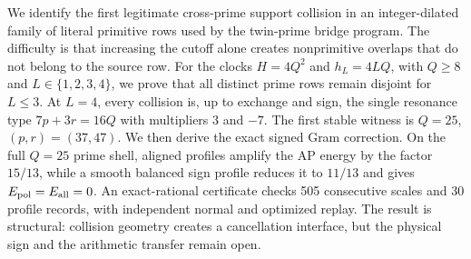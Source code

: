 We identify the first legitimate cross-prime support collision in an integer-dilated
family of literal primitive rows used by the twin-prime bridge program.  The difficulty
is that increasing the cutoff alone creates nonprimitive overlaps that do not belong to
the source row.  For the clocks $H=4Q^2$ and $h_L=4LQ$, with $Q\ge8$ and
$L\in\{1,2,3,4\}$, we prove that all distinct prime rows remain disjoint for
$L\le3$.  At $L=4$, every collision is, up to exchange and sign, the single
resonance type $7p+3r=16Q$ with multipliers $3$ and $-7$.  The first stable witness
is $Q=25$, $(p,r)=(37,47)$.  We then derive the exact signed Gram correction.
On the full $Q=25$ prime shell, aligned profiles amplify the AP energy by the factor
$15/13$, while a smooth balanced sign profile reduces it to $11/13$ and gives
$E_{\rm pol}=E_{\rm all}=0$.  An exact-rational certificate checks 505 consecutive
scales and 30 profile records, with independent normal and optimized replay.  The
result is structural: collision geometry creates a cancellation interface, but the
physical sign and the arithmetic transfer remain open.
